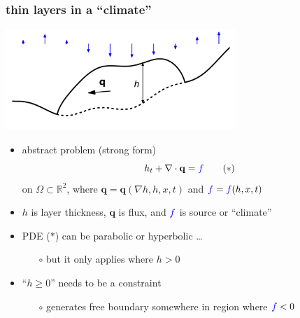 \documentclass[hide notes,intlimits]{beamer}
\newcommand{\RR}{\mathbb{R}}
\newcommand{\bq}{\mathbf{q}}
\newcommand{\Div}{\nabla\cdot}
\newcommand{\grad}{\nabla}
\begin{document}
\begin{frame}
  \frametitle{thin layers in a ``climate''}
\begin{center}
\includegraphics[width=0.65\textwidth,keepaspectratio=true]{cartoon-wclimate}
\end{center}
\vspace{-6mm}
\begin{itemize}
\item abstract problem (strong form)
  \begin{equation}
  h_t + \Div \bq = {\color{blue} f} \tag{$\ast$}
  \end{equation}
on $\Omega \subset \RR^2$, where $\bq=\bq(\grad h, h, x, t)$ and ${\color{blue} f}={\color{blue} f}(h,x,t)$
\item $h$ is layer thickness, $\bq$ is flux, and ${\color{blue} f}$ is source or ``climate''
\item PDE ($\ast$) can be parabolic or hyperbolic \dots
  \begin{itemize}
  \item[$\circ$] but it only applies where $h>0$
  \end{itemize}
\item ``$h\ge 0$'' needs to be a constraint
  \begin{itemize}
  \item[$\circ$] generates free boundary somewhere in region where ${\color{blue} f} < 0$
  \end{itemize}
\end{itemize}
\end{frame}
\end{document}
